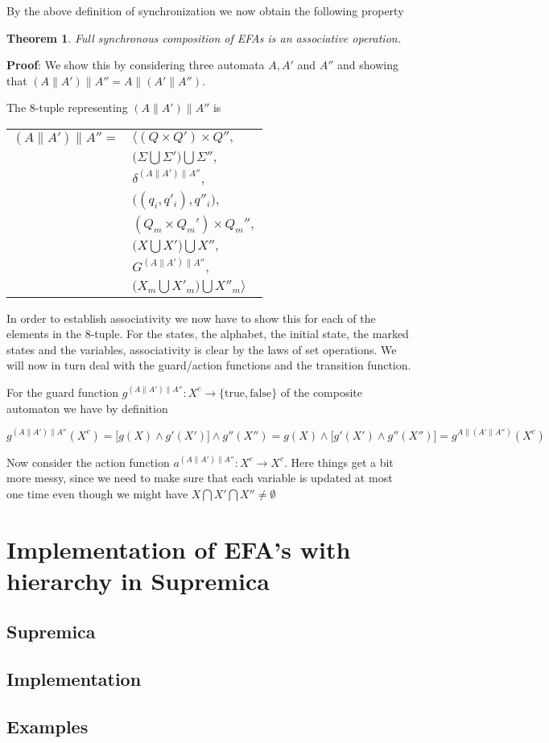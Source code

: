 \documentclass{article}
\newtheorem{theorem}{Theorem}
\begin{document}
\noindent By the above definition of synchronization we now obtain
the following property

\begin{theorem}
   Full synchronous composition of EFAs is an associative
   operation.
\end{theorem}

\noindent \textbf{Proof}: We show this by considering three
automata $A, A'$ and $A''$ and showing that $(A\|A')\|A'' =
A\|(A'\|A'')$.

The 8-tuple representing $(A\|A')\|A''$ is

\begin{center}
\begin{tabular}{ll}
  $(A\|A')\|A'' =$ & $\Big \langle (Q \times Q') \times Q'',$\\
  & $ \big(\Sigma \bigcup \Sigma' \big) \bigcup \Sigma'',$\\
  & $\delta^{(A\|A')\|A''},$\\
  & $\big((q_i, q'_i) , q''_i\big),$\\
  & $(Q_m \times Q_m') \times Q_m'',$\\
  & $\big(X \bigcup X') \bigcup X'',$\\
  & $G^{(A\|A')\|A''},$\\
  & $\big(X_m \bigcup X'_m) \bigcup X''_m \Big \rangle$
\end{tabular}
\end{center}

\noindent In order to establish associativity we now have to show
this for each of the elements in the 8-tuple. For the states, the
alphabet, the initial state, the marked states and the variables,
associativity is clear by the laws of set operations. We will now
in turn deal with the guard/action functions and the transition
function.

For the guard function $g^{(A\|A')\|A''} : X^c \rightarrow
\{\mathrm{true}, \mathrm{false}\}$ of the composite automaton we
have by definition

\begin{equation}
  g^{(A\|A')\|A''}(X^c) = \big[g(X) \wedge g'(X') \big] \wedge g''(X'') = g(X) \wedge \big[g'(X') \wedge g''(X'')] = g^{A\|(A'\|A'')}(X^c)
\end{equation}

\noindent Now consider the action function $a^{(A\|A')\|A''} : X^c
\rightarrow X^c$. Here things get a bit more messy, since we need
to make sure that each variable is updated at most one time even
though we might have $X\bigcap X'\bigcap X'' \neq \emptyset$

\section{Implementation of EFA's with hierarchy in Supremica}

\subsection{Supremica}

\subsection{Implementation}\label{Implementation}
\subsection{Examples}
\end{document}
